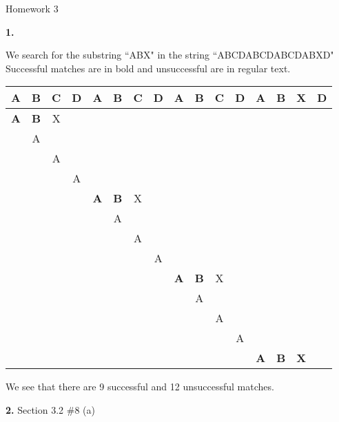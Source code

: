 \documentclass[letterpaper, 11pt]{article}
\newcommand{\hwnumber}[1]{\medskip \noindent\textbf{#1.} \smallskip}
\newcommand{\hwnumbersec}[3]{\medskip \noindent\textbf{#1.} Section #2 \##3 \smallskip}
\begin{document}
\begin{center}
	{\LARGE Homework 3}\\
\end{center}

\hwnumber{1}

We search for the substring ``ABX" in the string
``ABCDABCDABCDABXD" Successful matches are in bold and unsuccessful are in
regular text. 

\begin{center}
  \begin{tabular}{cccccccccccccccc}
    A & B & C & D & A & B & C & D & A & B & C & D & A & B & X & D \\
    \hline
    \textbf{A} & \textbf{B} & X \\
               & A \\
               & & A \\
               & & & A \\
               & & & & \textbf{A} & \textbf{B} & X \\
               & & & & & A \\
               & & & & & & A \\
               & & & & & & & A \\
               & & & & & & & & \textbf{A} & \textbf{B} & X \\
               & & & & & & & & & A \\
               & & & & & & & & & & A \\
               & & & & & & & & & & & A \\
               & & & & & & & & & & & & \textbf{A} & \textbf{B} & \textbf{X} \\
  \end{tabular}
\end{center}

We see that there are 9 successful and 12 unsuccessful matches. 

\hwnumbersec{2}{3.2}{8 (a)}
\end{document}

